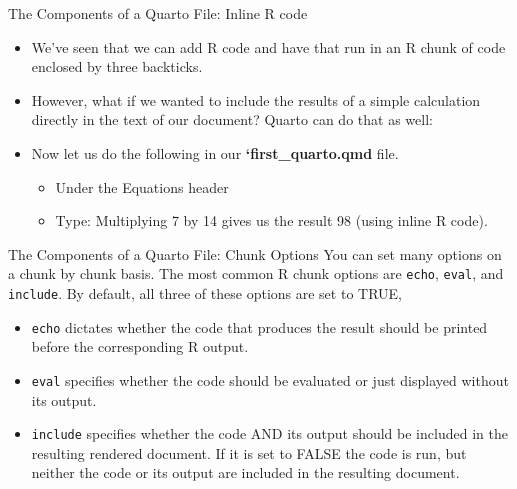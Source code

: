 \documentclass[
  ignorenonframetext,
]{beamer}
\providecommand{\tightlist}{%
  \setlength{\itemsep}{0pt}\setlength{\parskip}{0pt}}
\begin{document}
\begin{frame}{The Components of a Quarto File: Inline R code}
\protect\hypertarget{the-components-of-a-quarto-file-inline-r-code}{}
\begin{itemize}
\item
  We've seen that we can add R code and have that run in an R chunk of
  code enclosed by three backticks.
\item
  However, what if we wanted to include the results of a simple
  calculation directly in the text of our document? Quarto can do that
  as well:
\item
  Now let us do the following in our \textbf{`first\_quarto.qmd} file.

  \begin{itemize}
  \tightlist
  \item
    Under the Equations header
  \item
    Type: Multiplying 7 by 14 gives us the result 98 (using inline R
    code).
  \end{itemize}
\end{itemize}
\end{frame}

\begin{frame}[fragile]{The Components of a Quarto File: Chunk Options}
\protect\hypertarget{the-components-of-a-quarto-file-chunk-options}{}
You can set many options on a chunk by chunk basis. The most common R
chunk options are \texttt{echo}, \texttt{eval}, and \texttt{include}. By
default, all three of these options are set to TRUE,

\begin{itemize}
\item
  \texttt{echo} dictates whether the code that produces the result
  should be printed before the corresponding R output.
\item
  \texttt{eval} specifies whether the code should be evaluated or just
  displayed without its output.
\item
  \texttt{include} specifies whether the code AND its output should be
  included in the resulting rendered document. If it is set to FALSE the
  code is run, but neither the code or its output are included in the
  resulting document.
\end{itemize}
\end{frame}
\end{document}
